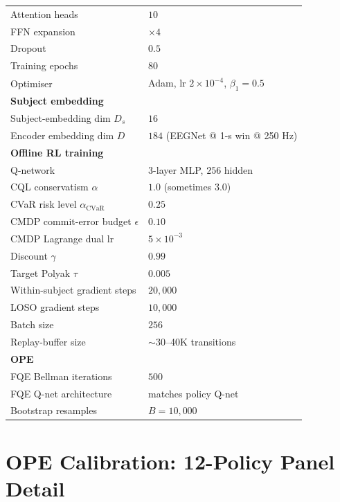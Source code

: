 \documentclass[conference]{IEEEtran}
\newcommand{\cql}{CQL}
\newcommand{\cvar}{\mathrm{CVaR}}
\begin{document}
\begin{table}[h]
\begin{tabular}{l l}
Attention heads                & $10$ \\
FFN expansion                  & $\times 4$ \\
Dropout                        & $0.5$ \\
Training epochs                & $80$ \\
Optimiser                      & Adam, lr $2\!\times\!10^{-4}$, $\beta_1\!=\!0.5$ \\
\midrule
\multicolumn{2}{l}{\textbf{Subject embedding}} \\
Subject-embedding dim $D_s$    & $16$ \\
Encoder embedding dim $D$      & $184$ (EEGNet @ 1-s win @ 250 Hz) \\
\midrule
\multicolumn{2}{l}{\textbf{Offline RL training}} \\
Q-network                      & 3-layer MLP, $256$ hidden \\
\cql{} conservatism $\alpha$   & $1.0$ (sometimes $3.0$) \\
CVaR risk level $\alpha_{\cvar}$& $0.25$ \\
CMDP commit-error budget $\epsilon$& $0.10$ \\
CMDP Lagrange dual lr          & $5\!\times\!10^{-3}$ \\
Discount $\gamma$              & $0.99$ \\
Target Polyak $\tau$           & $0.005$ \\
Within-subject gradient steps  & $20{,}000$ \\
LOSO gradient steps            & $10{,}000$ \\
Batch size                     & $256$ \\
Replay-buffer size             & $\sim$30--40K transitions \\
\midrule
\multicolumn{2}{l}{\textbf{OPE}} \\
FQE Bellman iterations         & $500$ \\
FQE Q-net architecture         & matches policy Q-net \\
Bootstrap resamples            & $B\!=\!10{,}000$ \\
\bottomrule
\end{tabular}
\end{table}

\section{OPE Calibration: 12-Policy Panel Detail}
\end{document}
